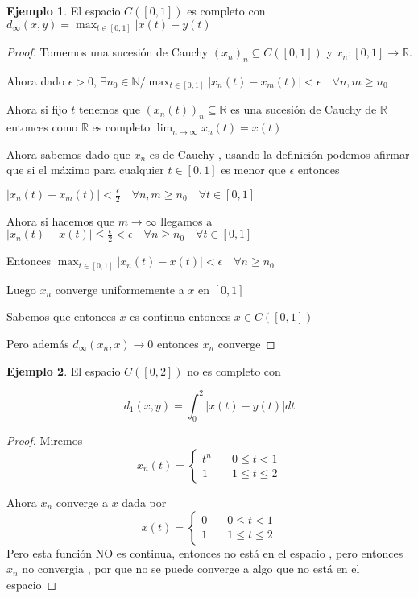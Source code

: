 \documentclass[12pt]{article}
\newcommand{\R}{\mathbb{R}}
\newcommand{\N}{\mathbb{N}}
\newcommand{\ra}{\rightarrow}
\theoremstyle{definition}
\newtheorem{ex}{Ejemplo}
\begin{document}
\begin{ex}
  El espacio $C([0,1])$ es completo con $d_{\infty}(x,y) = \max_{t \in [0,1]} |x(t)-y(t)|$
  \begin{proof}
    Tomemos una sucesión de Cauchy $(x_n)_n \subseteq C([0,1])$ y $x_n: [0,1] \ra \R$.

    Ahora dado $\epsilon >0$, $\exists n_0 \in \N /\max_{t \in [0,1]} |x_n(t) - x_m(t)| < \epsilon \quad \forall n,m \geq n_0 $

    Ahora si fijo $t$ tenemos que $(x_n(t))_n \subseteq \R$ es una sucesión de Cauchy de $\R$ entonces como $\R$ es completo $\lim_{n \ra \infty} x_n(t) = x(t)$

    Ahora sabemos dado que $x_n$ es de Cauchy , usando la definición podemos afirmar que si el máximo para cualquier $t \in [0,1]$ es menor que $\epsilon$ entonces

    $|x_n(t) - x_m(t)| < \frac{\epsilon}{2} \quad \forall n,m \geq n_0 \quad \forall t \in [0,1]$

    Ahora si hacemos que $m \ra \infty$ llegamos a $|x_n(t) - x(t)| \leq \frac{\epsilon}{2} < \epsilon \quad \forall n \geq n_0 \quad \forall t \in [0,1]$

    Entonces $\max_{t \in [0,1]} |x_n(t) - x(t)| < \epsilon \quad \forall n \geq n_0$

    Luego $x_n$ converge uniformemente a $x$ en $[0,1]$

    Sabemos que entonces $x$ es continua entonces $x \in C([0,1])$

    Pero además $d_{\infty} (x_n,x) \ra 0$ entonces $x_n$ converge
  \end{proof}
\end{ex}
\begin{ex}
  El espacio $C([0,2])$ no es completo con

  $$ d_1(x,y) = \int_{0}^2 |x(t) - y(t)| dt$$
  \begin{proof}
    Miremos 
$$
x_n(t) = \left\{
        \begin{array}{ll}
            t^n & \quad 0 \leq t < 1 \\
            1 & \quad 1 \leq t \leq 2
        \end{array}
    \right.
$$  

Ahora $x_n$ converge a $x$ dada por 
$$
x(t) = \left\{
        \begin{array}{ll}
            0 & \quad 0 \leq t < 1 \\
            1 & \quad 1 \leq t \leq 2
        \end{array}
    \right.
$$
Pero esta función NO es continua, entonces no está en el espacio , pero entonces $x_n$ no convergia , por que no se puede converge a algo que no está en el espacio
\end{proof}
\end{ex}
\end{document}
